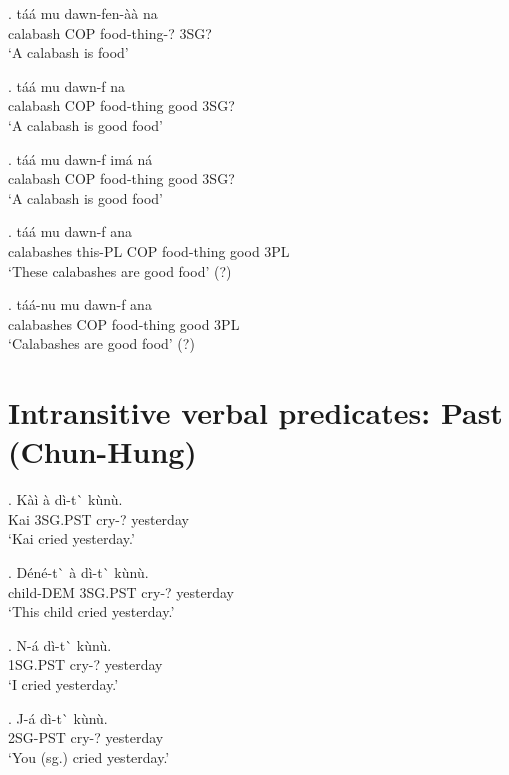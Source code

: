 \documentclass{assets/fieldnotes}
\begin{document}
{\exg. táá mu dawn-fen-àà na\\
calabash COP food-thing-? 3SG?\\
`A calabash is food'

\exg. táá mu dawn-f  na\\
calabash COP food-thing good 3SG?\\
`A calabash is good food'


\exg. táá mu dawn-f \textipa{\textltailn}imá ná\\
calabash COP food-thing good 3SG?\\
`A calabash is good food'

\exg.  táá  mu dawn-f  ana\\
calabashes this-PL COP food-thing good 3PL\\
`These calabashes are good food' (?)

\exg. táá-nu mu dawn-f  ana\\
calabashes COP food-thing good 3PL\\
`Calabashes are good food' (?)



\section{Intransitive verbal predicates: Past (Chun-Hung)}



\exg. K\`{a}\`{i} \`{a} d\`{i}-t\`{} k\`{u}n\`{u}. \\
Kai 3SG.PST cry-? yesterday \\
`Kai cried yesterday.' 
 
\exg. D\'{e}n\'{e}-t\`{} \`{a} d\`{i}-t\`{} k\`{u}n\`{u}. \\
child-DEM 3SG.PST cry-? yesterday \\
`This child cried yesterday.'

\exg. N-\'{a} d\`{i}-t\`{} k\`{u}n\`{u}. \\
1SG.PST cry-? yesterday \\
`I cried yesterday.'

\exg. J-\'{a} d\`{i}-t\`{} k\`{u}n\`{u}. \\
2SG-PST cry-? yesterday \\
`You (sg.) cried yesterday.' 

}
\end{document}
